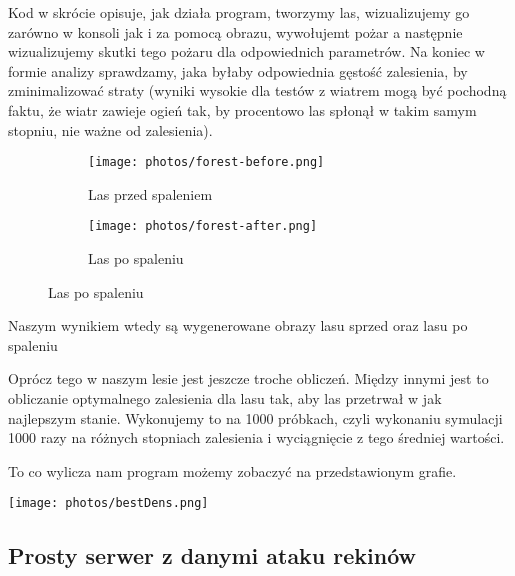 \documentclass{article}
\begin{document}
\vspace{2em}

Kod w skrócie opisuje, jak działa program, tworzymy las, wizualizujemy go zarówno w konsoli jak i za pomocą obrazu, wywołujemt pożar a następnie wizualizujemy skutki tego pożaru dla odpowiednich parametrów.
Na koniec w formie analizy sprawdzamy, jaka byłaby odpowiednia gęstość zalesienia, by zminimalizować straty (wyniki wysokie dla testów z wiatrem mogą być pochodną faktu, że wiatr zawieje ogień tak, by procentowo las spłonął w takim samym stopniu, nie ważne od zalesienia).

\vspace{2em}

\begin{figure}[h]
  \centering
  \begin{subfigure}[t]{0.48\textwidth}
    \centering
    \texttt{[image: photos/forest-before.png]}
    \caption{Las przed spaleniem}
  \end{subfigure}%
  \hfill
  \begin{subfigure}[t]{0.48\textwidth}
    \centering
    \texttt{[image: photos/forest-after.png]}
    \caption{Las po spaleniu}
  \end{subfigure}
\end{figure}

\vspace{2em}

Naszym wynikiem wtedy są wygenerowane obrazy lasu sprzed oraz lasu po spaleniu

\vspace{2em}

Oprócz tego w naszym lesie jest jeszcze troche obliczeń. Między innymi jest to obliczanie optymalnego zalesienia dla lasu tak, aby las przetrwał w jak najlepszym stanie. Wykonujemy to na 1000 próbkach, czyli wykonaniu symulacji 1000 razy na różnych stopniach zalesienia i wyciągnięcie z tego średniej wartości.

\vspace{1em}

To co wylicza nam program możemy zobaczyć na przedstawionym grafie.

\vspace{2em}

\texttt{[image: photos/bestDens.png]}


\vspace{2em}

\subsection{Prosty serwer z danymi ataku rekinów}
\end{document}
